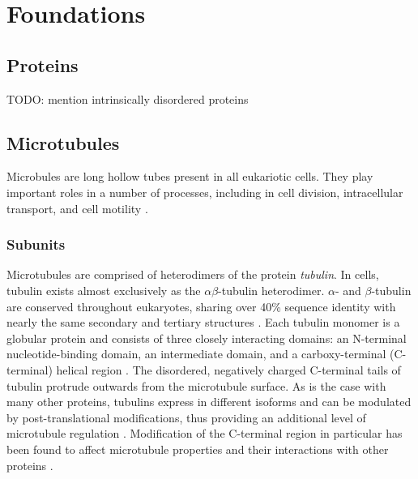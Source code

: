 \section{Foundations}
\subsection{Proteins}
\label{sec:proteins}
TODO: mention intrinsically disordered proteins

\subsection{Microtubules}
\label{sec:microtubules}
Microbules are long hollow tubes present in all eukariotic cells. They play important roles in a number of processes, including in cell division, intracellular transport, and cell motility \parencite{Akhmanova2022}.

\subsubsection{Subunits}
\label{sec:tubulin}
Microtubules are comprised of heterodimers of the protein \textit{tubulin}. In cells, tubulin exists almost exclusively as the $\alpha\beta$-tubulin heterodimer. $\alpha$- and $\beta$-tubulin are conserved throughout eukaryotes, sharing over 40\% sequence identity with nearly the same secondary and tertiary structures \parencite{DOWNING199816}. Each tubulin monomer is a globular protein and consists of three closely interacting domains: an N-terminal nucleotide-binding domain, an intermediate domain, and a carboxy-terminal (C-terminal) helical region \parencite{ALUSHIN20141117}. The disordered, negatively charged C-terminal tails of tubulin protrude outwards from the microtubule surface. As is the case with many other proteins, tubulins express in different isoforms and can be modulated by post-translational modifications, thus providing an additional level of microtubule regulation \parencite{Janke2014}. Modification of the C-terminal region in particular has been found to affect microtubule properties and their interactions with other proteins \parencite{Janke2020}. 


